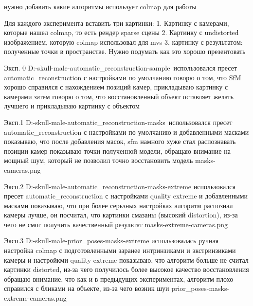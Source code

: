 нужно добавить какие алгоритмы использует colmap для работы

Для каждого эксперимента вставить три картинки:
1. Картинку с камерами, которые нашел colmap, то есть рендер sparse сцены
2. Картинку с undistorted изображением, которую colmap использовал для mvs
3. картинку с результатом: полученные точки в пространстве. Нужно подумать как это хорошо презентовать

Эксп. 0 D:\thesis{}-skull-male\amethyst-automatic_reconstruction-sample\dense\0\
       использовался пресет automatic_reconstruction с настройками по умолчанию
       говорю о том, что SfM хорошо справился с нахождением позиций камер, прикладываю картинку с камерами
       затем говорю о том, что восстановленный объект оставляет желать лучшего и прикладываю картинку с объектом


Эксп.1 D:\thesis{}-skull-male\amethyst-automatic_reconstruction-masks\dense\0\
       использовался пресет automatic_reconstruction с настройками по умолчанию и добавленными масками
       показываю, что после добавления масок, sfm намного хуже стал распознавать позиции камер
       показываю точки полученной модели, обращаю внимание на мощный шум, который не позволил точно восстановить модель
       masks-cameras.png

Эксп.2 D:\thesis{}-skull-male\amethyst-automatic_reconstruction-masks-extreme
       использовался пресет automatic_reconstruction с настройками quality extreme и добавленными масками
       показываю, что при более серьзных настройках алгоритм распознал камеры лучше,
       он посчитал, что картинки смазаны (высокий distortion), из-за чего не смог получить качественный результат
       masks-extreme-cameras.png

Эксп.3 D:\thesis{}-skull-male\amethyst-prior_poses-masks-extreme
       использовалась ручная настройка colmap с подготовленными заранее интринзиками и экстринзиками камеры и настройкми quality extreme
       показываю, что алгоритм больше не считал картинки distorted, из-за чего получилось более высокое качество восстановления
       обращаю внимание, что как и в предыдущих экспериментах, алгоритм плохо справился с бликами на объекте, из-за чего возник шуи
       prior_poses-masks-extreme-cameras.png


